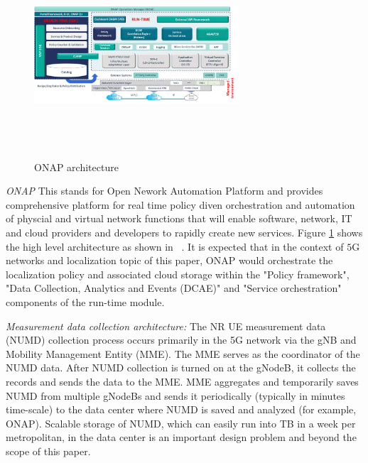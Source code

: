\documentclass[conference, 10pt]{IEEEtran}
\begin{document}
\begin{figure}[t]
\begin{center}
\includegraphics[height=3.0in,width=3.0in]{./ONAP-architecture.png}
\caption{\label{fig:onap_arch}
{\small ONAP architecture}}
\end{center}
\end{figure}



{\em ONAP} This stands for Open Nework Automation Platform and provides comprehensive platform for real time policy diven orchestration and automation of physcial and virtual network functions that will enable software, network,
IT and cloud providers and developers to rapidly create new services. Figure \ref{fig:onap_arch} shows the high level architecture as shown in ~\cite{ONAP}. It is expected that in the context of $5$G networks and localization topic of this paper, ONAP would orchestrate the localization policy and associated cloud storage within the "Policy framework", "Data Collection, Analytics and Events (DCAE)" and "Service orchestration" components of the run-time module. 

{\em Measurement data collection architecture:} The NR UE measurement data (NUMD) collection process occurs primarily in the 5G network via the gNB and Mobility Management Entity (MME). The MME serves as the coordinator of the NUMD data.
After NUMD collection is turned on at the gNodeB, it collects the records and sends
the data to the MME. MME aggregates and temporarily saves NUMD from multiple
gNodeBs and sends it periodically (typically in minutes time-scale) to the data
center  where NUMD is saved and analyzed (for example, ONAP). Scalable storage of NUMD, which can easily
run into TB in a week per metropolitan, in the data center is an important design
problem and beyond the scope of this paper.
\end{document}
